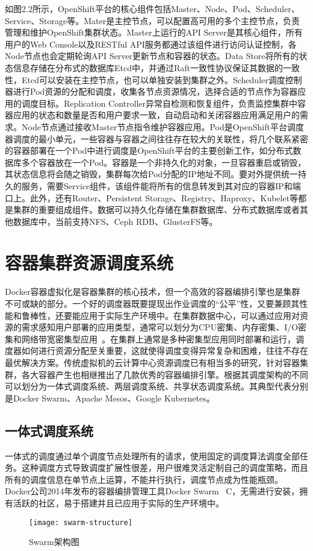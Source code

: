 如图2.2所示，OpenShift平台的核心组件包括Master、Node、Pod、Scheduler、Service、Storage等。Mater是主控节点，可以配置高可用的多个主控节点，负责管理和维护OpenShift集群状态。Master上运行的API Server是其核心组件，所有用户的Web Console以及RESTful API服务都通过该组件进行访问认证控制，各Node节点也会定期轮询API Server更新节点和容器的状态。Data Store将所有的状态信息存储在分布式的数据库Etcd中，并通过Raft一致性协议保证其数据的一致性，Etcd可以安装在主控节点，也可以单独安装到集群之外。Scheduler调度控制器进行Pod资源的分配和调度，收集各节点资源情况，选择合适的节点作为容器应用的调度目标。Replication Controller异常自检测和恢复组件，负责监控集群中容器应用的状态和数量是否和用户要求一致，自动启动和关闭容器应用满足用户的需求。Node节点通过接收Master节点指令维护容器应用。Pod是OpenShift平台调度器调度的最小单元，一些容器与容器之间往往存在较大的关联性，将几个联系紧密的容器部署在一个Pod中进行调度是OpenShift平台的主要创新工作，如分布式数据库多个容器放在一个Pod。容器是一个非持久化的对象，一旦容器重启或销毁，其状态信息将会随之销毁，集群每次给Pod分配的IP地址不同。要对外提供统一持久的服务，需要Service组件，该组件能将所有的信息转发到其对应的容器IP和端口上。此外，还有Router、Persistent Storage、Registry、Haproxy、Kubelet等都是集群的重要组成组件。数据可以持久化存储在集群数据库、分布式数据库或者其他数据库中，当前支持NFS、Ceph RDB、GlusterFS等。

\section{容器集群资源调度系统}
Docker容器虚拟化是容器集群的核心技术，但一个高效的容器编排引擎也是集群不可或缺的部分。一个好的调度器既要提现出作业调度的“公平”性，又要兼顾其性能和鲁棒性，还要能应用于实际生产环境中。在集群数据中心，可以通过应用对资源的需求感知用户部署的应用类型，通常可以划分为CPU密集、内存密集、I/O密集和网络带宽密集型应用~\cite{Peng2016Research,Shuangke2017SchedulingStrategy}。在集群上通常是多种密集型应用同时部署和运行，调度器如何进行资源分配至关重要，这就使得调度变得异常复杂和困难，往往不存在最优解决方案。传统虚拟机的云计算中心资源调度已有相当多的研究，针对容器集群，各大容器产生也相继推出了几款优秀的容器编排引擎。根据其调度架构的不同可以划分为一体式调度系统、两层调度系统、共享状态调度系统。其典型代表分别是Docker Swarm、Apache Mesos、Google Kubernetes。

\subsection{一体式调度系统}
一体式的调度通过单个调度节点处理所有的请求，使用固定的调度算法调度全部任务。这种调度方式导致调度扩展性很差，用户很难灵活定制自己的调度策略，而且所有的调度信息在单节点上运算，不能并行执行，调度节点成为性能瓶颈。Docker公司2014年发布的容器编排管理工具Docker Swarm~\cite{Jansen2016Employing,Naik2016Building} C，无需进行安装，拥有活跃的社区，易于搭建并且已应用于实际的生产环境中。
\begin{figure}[H] %
	\centering
	\texttt{[image: swarm-structure]}
	\caption{Swarm架构图}
\end{figure}

